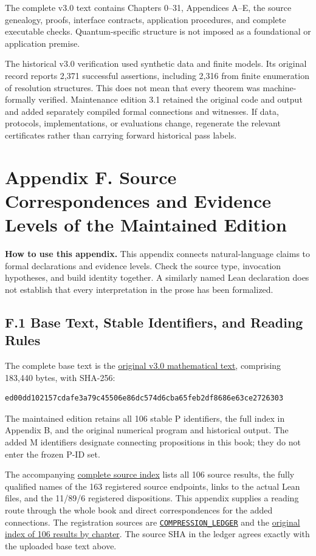 \documentclass[
  english,
  11pt,
  oneside]{book}
\begin{document}
The complete v3.0 text contains Chapters 0--31, Appendices A--E, the source genealogy, proofs, interface contracts, application procedures, and complete executable checks. Quantum-specific structure is not imposed as a foundational or application premise.

The historical v3.0 verification used synthetic data and finite models. Its original record reports 2,371 successful assertions, including 2,316 from finite enumeration of resolution structures. This does not mean that every theorem was machine-formally verified. Maintenance edition 3.1 retained the original code and output and added separately compiled formal connections and witnesses. If data, protocols, implementations, or evaluations change, regenerate the relevant certificates rather than carrying forward historical pass labels.

\chapter{Appendix F. Source Correspondences and Evidence Levels of the Maintained Edition}\label{appendix-f}

\textbf{How to use this appendix.} This appendix connects natural-language claims to formal declarations and evidence levels. Check the source type, invocation hypotheses, and build identity together. A similarly named Lean declaration does not establish that every interpretation in the prose has been formalized.

\section{F.1 Base Text, Stable Identifiers, and Reading Rules}\label{f.1-base-text-stable-identifiers-and-reading-rules}

The complete base text is the \href{source/core-v3.0/UEOT_Core_Mathematics_v3.0_Complete.md}{original v3.0 mathematical text}, comprising 183,440 bytes, with SHA-256:

\begin{verbatim}
ed00dd102157cdafe3a79c45506e86dc574d6cba65feb2df8686e63ce2726303
\end{verbatim}

The maintained edition retains all 106 stable P identifiers, the full index in Appendix B, and the original numerical program and historical output. The added M identifiers designate connecting propositions in this book; they do not enter the frozen P-ID set.

The accompanying \href{UEOT_MATHEMATICS_SOURCES.md}{complete source index} lists all 106 source results, the fully qualified names of the 163 registered source endpoints, links to the actual Lean files, and the 11/89/6 registered dispositions. This appendix supplies a reading route through the whole book and direct correspondences for the added connections. The registration sources are \href{../formalization/ueot-core/docs/compression/COMPRESSION_LEDGER.yaml}{\nolinkurl{COMPRESSION_LEDGER}} and the \href{../formalization/ueot-core/docs/CORE_COMPRESSION_THEOREM_INDEX.csv}{original index of 106 results by chapter}. The source SHA in the ledger agrees exactly with the uploaded base text above.
\end{document}
